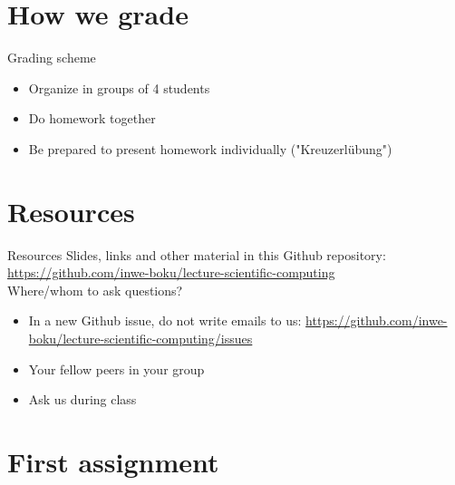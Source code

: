 \documentclass[10pt,color=usenames,dvipsnames]{beamer}
\begin{document}
\section{How we grade}

\begin{frame}{Grading scheme}

	\begin{itemize}
		\item Organize in groups of 4 students
		\item Do homework together
		\item Be prepared to present homework individually ("Kreuzerlübung")
	\end{itemize}

\end{frame}

\section{Resources}

\begin{frame}[fragile]{Resources}
    Slides, links and other material in this Github repository:
    \href{https://github.com/inwe-boku/lecture-scientific-computing}{https://github.com/inwe-boku/lecture-scientific-computing}\\
    \bigskip
    \pause
    Where/whom to ask questions?
	\begin{itemize}
        \item In a new Github issue, do not write emails to us:
            \href{https://github.com/inwe-boku/lecture-scientific-computing/issues}{https://github.com/inwe-boku/lecture-scientific-computing/issues}
		\item Your fellow peers in your group
		\item Ask us during class
	\end{itemize}
\end{frame}

\section{First assignment}
\end{document}
